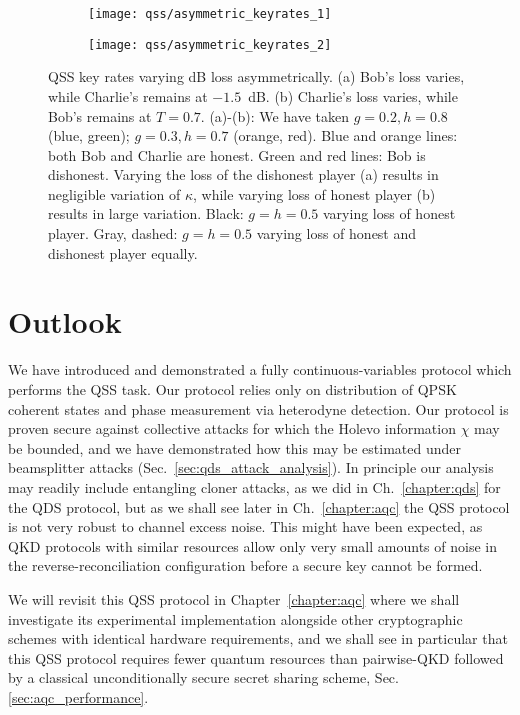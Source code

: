 \begin{figure}[htp]
\centering
	\begin{subfigure}{0.49\linewidth}
	\centering
	\texttt{[image: qss/asymmetric\_keyrates\_1]}
	\caption{}
	\end{subfigure}
	\begin{subfigure}{0.49\linewidth}
	\centering
	\texttt{[image: qss/asymmetric\_keyrates\_2]}
	\caption{}
	\end{subfigure}
\caption{\label{fig:qss_keyrate_asymmetric} QSS key rates varying dB loss asymmetrically. (a) Bob's loss varies, while Charlie's remains at $-1.5$~dB. (b) Charlie's loss varies, while Bob's remains at $T=0.7$. (a)-(b): We have taken $g = 0.2, h=0.8$ (blue, green); $g=0.3, h=0.7$ (orange, red). Blue and orange lines: both Bob and Charlie are honest. Green and red lines: Bob is dishonest. Varying the loss of the dishonest player (a) results in negligible variation of $\kappa$, while varying loss of honest player (b) results in large variation. Black: $g=h=0.5$ varying loss of honest player. Gray, dashed: $g=h=0.5$ varying loss of honest and dishonest player equally.}
\end{figure}






\section{Outlook}\label{sec:qss_outlook}
We have introduced and demonstrated a fully continuous-variables protocol which performs the QSS task. Our protocol relies only on distribution of QPSK coherent states and phase measurement via heterodyne detection. Our protocol is proven secure against collective attacks for which the Holevo information $\chi$ may be bounded, and we have demonstrated how this may be estimated under beamsplitter attacks (Sec.~\ref{sec:qds_attack_analysis}). In principle our analysis may readily include entangling cloner attacks, as we did in Ch.~\ref{chapter:qds} for the QDS protocol, but as we shall see later in Ch.~\ref{chapter:aqc} the QSS protocol is not very robust to channel excess noise. This might have been expected, as QKD protocols with similar resources \cite{Papanastasiou2018, Zhao2009} allow only very small amounts of noise in the reverse-reconciliation configuration before a secure key cannot be formed. 

We will revisit this QSS protocol in Chapter~\ref{chapter:aqc} where we shall investigate its experimental implementation alongside other cryptographic schemes with identical hardware requirements, and we shall see in particular that this QSS protocol requires fewer quantum resources than pairwise-QKD followed by a classical unconditionally secure secret sharing scheme, Sec.
\ref{sec:aqc_performance}.

